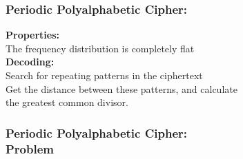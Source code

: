 \documentclass{uva-inf-presentation}
\begin{document}
\begin{frame}
\frametitle{Periodic Polyalphabetic Cipher:}
\textbf{Properties:}\\
\hspace{4ex}The frequency distribution is completely flat\\

\textbf{Decoding:}\\
\hspace{4ex}Search for repeating patterns in the ciphertext\\
\hspace{4ex}Get the distance between these patterns, and calculate\\
\hspace{4ex}the greatest common divisor.
\end{frame}

\begin{frame}
\frametitle{Periodic Polyalphabetic Cipher:\\ Problem}
\vspace{-30pt}

\end{frame}
\end{document}
